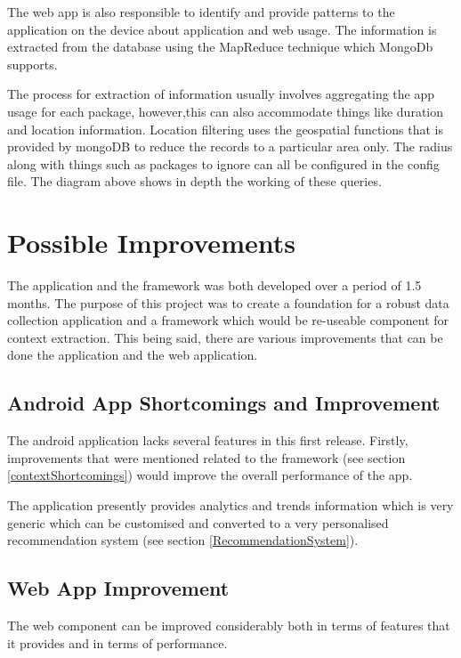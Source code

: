 \documentclass[12pt]{report}
\begin{document}
The web app is also responsible to identify and provide patterns to the application on the device about application and web usage. The information is extracted from the database using the MapReduce technique which MongoDb supports. 

The process for extraction of information usually involves aggregating the app usage for each package, however,this can also accommodate things like duration and location information. Location filtering uses the geospatial functions that is provided by mongoDB to reduce the records to a particular area only. The radius along with things such as packages to ignore can all be configured in the config file. The diagram above shows in depth the working of these queries.

\section{Possible Improvements}

The application and the framework was both developed over a period of 1.5 months. The purpose of this project was to create a foundation for a robust data collection application and a framework which would be re-useable component for context extraction. This being said, there are various improvements that can be done the application and the web application.

\subsection{Android App Shortcomings  and Improvement}

The android application lacks several features in this first release. Firstly, improvements that were mentioned related to the framework (see section \ref{contextShortcomings}) would improve the overall performance of the app.

The application presently provides analytics and trends information which is very generic which can be customised and converted to a very personalised recommendation system (see section \ref{RecommendationSystem}).

\subsection{Web App Improvement}

The web component can be improved considerably both in terms of features that it provides and in terms of performance. 
\end{document}
